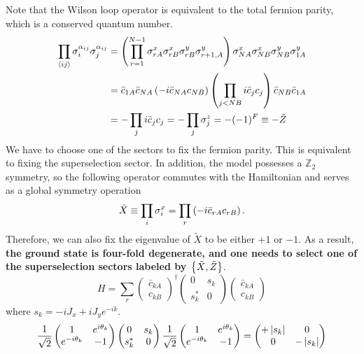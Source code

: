 Note that the Wilson loop operator is equivalent to the total fermion parity, which is a conserved quantum number.
\begin{align*}
\prod_{\langle ij \rangle}\sigma_{i}^{\alpha_{ij}}\sigma_{j}^{\alpha_{ij}}
&=
\left( 
    \prod_{r=1}^{N-1}
    \sigma^x_{rA}\sigma^x_{rB}
    \sigma^y_{rB}\sigma^y_{r+1,A}
 \right)
\sigma^x_{NA}\sigma^x_{NB}
\sigma^y_{NB}\sigma^y_{1A} \\
&=
\bar{c}_{1A}\bar{c}_{NA}
\left( -i\bar{c}_{NA}c_{NB} \right)
\left( \prod_{j< NB} i\bar{c}_j c_j \right)
\bar{c}_{NB}\bar{c}_{1A} \\
&=
-\prod_{j}i\bar{c}_j c_j = -\prod_{j}\sigma^z_j = -(-1)^{F} \equiv -\tilde{Z}
\end{align*}
We have to choose one of the sectors to fix the fermion parity. This is equivalent to fixing the superselection sector. In addition, the model possesses a $\mathbb{Z}_2$ symmetry, so the following operator commutes with the Hamiltonian and serves as a global symmetry operation
\[
\tilde{X} \equiv 
\prod_{i}\sigma^x_i
=
\prod_{r}
\left( -i\bar{c}_{rA} c_{rB} \right).
\]
Therefore, we can also fix the eigenvalue of $\tilde{X}$ to be either $+1$ or $-1$. As a result, \textbf{the ground state is four-fold degenerate, and one needs to select one of the superselection sectors labeled by $\left\{ \tilde{X},\tilde{Z} \right\}$}. 
\[
    H
    =
    \sum_{r}
    \begin{pmatrix}
        \bar{c}_{kA} \\
        c_{kB}
    \end{pmatrix}^\dagger
    \begin{pmatrix}
        0 & s_k \\
        s_k^* & 0
    \end{pmatrix}
    \begin{pmatrix}
        \bar{c}_{kA} \\
        c_{kB}
    \end{pmatrix} 
\]
where $s_k = -iJ_x + iJ_y e^{-ik}$.
\[
\frac{1}{\sqrt{2}}
\begin{pmatrix}
    1 & e^{i\theta_k} \\
    e^{-i\theta_k} & -1
\end{pmatrix}
\begin{pmatrix}
    0 & s_k \\
    s_k^* & 0
\end{pmatrix}
\frac{1}{\sqrt{2}}
\begin{pmatrix}
    1 & e^{i\theta_k} \\
    e^{-i\theta_k} & -1
\end{pmatrix}
=
\begin{pmatrix}
    +\left| s_k \right| & 0 \\
    0 & -\left| s_k \right|
\end{pmatrix}
\]
